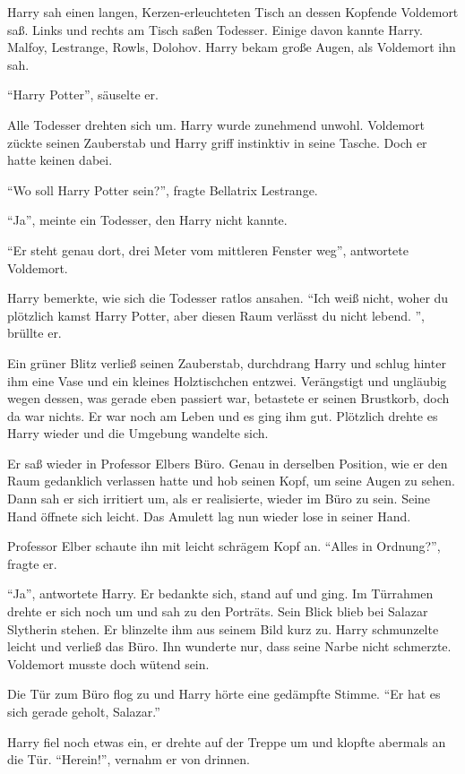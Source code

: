 Harry sah einen langen, Kerzen-erleuchteten Tisch an dessen Kopfende Voldemort saß. Links und rechts am Tisch saßen Todesser. Einige davon kannte Harry. Malfoy, Lestrange, Rowls, Dolohov. Harry bekam große Augen, als Voldemort ihn sah.

\enquote{Harry Potter}, säuselte er.

Alle Todesser drehten sich um. Harry wurde zunehmend unwohl. Voldemort zückte seinen Zauberstab und Harry griff instinktiv in seine Tasche. Doch er hatte keinen dabei.

\enquote{Wo soll Harry Potter sein?}, fragte Bellatrix Lestrange.

\enquote{Ja}, meinte ein Todesser, den Harry nicht kannte.

\enquote{Er steht genau dort, drei Meter vom mittleren Fenster weg}, antwortete Voldemort.

Harry bemerkte, wie sich die Todesser ratlos ansahen. \enquote{Ich weiß nicht, woher du plötzlich kamst Harry Potter, aber diesen Raum verlässt du nicht lebend. \gst {}}, brüllte er.

Ein grüner Blitz verließ seinen Zauberstab, durchdrang Harry und schlug hinter ihm eine Vase und ein kleines Holztischchen entzwei. Verängstigt und ungläubig wegen dessen, was gerade eben passiert war, betastete er seinen Brustkorb, doch da war nichts. Er war noch am Leben und es ging ihm gut. Plötzlich drehte es Harry wieder und die Umgebung wandelte sich.

Er saß wieder in Professor Elbers Büro. Genau in derselben Position, wie er den Raum gedanklich verlassen hatte und hob seinen Kopf, um seine Augen zu sehen. Dann sah er sich irritiert um, als er realisierte, wieder im Büro zu sein. Seine Hand öffnete sich leicht. Das Amulett lag nun wieder lose in seiner Hand.

Professor Elber schaute ihn mit leicht schrägem Kopf an. \enquote{Alles in Ordnung?}, fragte er.

\enquote{Ja}, antwortete Harry. Er bedankte sich, stand auf und ging. Im Türrahmen drehte er sich noch um und sah zu den Porträts. Sein Blick blieb bei Salazar Slytherin stehen. Er blinzelte ihm aus seinem Bild kurz zu. Harry schmunzelte leicht und verließ das Büro. Ihn wunderte nur, dass seine Narbe nicht schmerzte. Voldemort musste doch wütend sein.

Die Tür zum Büro flog zu und Harry hörte eine gedämpfte Stimme. \enquote{Er hat es sich gerade geholt, Salazar.}

Harry fiel noch etwas ein, er drehte auf der Treppe um und klopfte abermals an die Tür. \enquote{Herein!}, vernahm er von drinnen.

